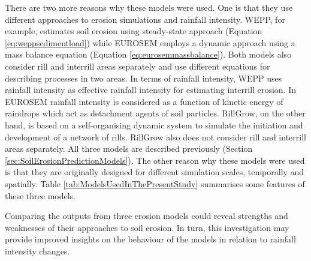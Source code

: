 There are two more reasons why these models were used. One is that they use
different approaches to erosion simulations and rainfall intensity. WEPP, for
example, estimates soil erosion using steady-state approach
(Equation \ref{eq:weppsedimentload}) while EUROSEM employs a dynamic approach
using a mass balance equation (Equation \ref{eq:eurosemmassbalance}).
Both models also consider rill and interrill areas separately and use
different equations for describing processes in two areas. In terms of
rainfall intensity, WEPP uses rainfall intensity as effective rainfall
intensity for estimating interrill erosion. In EUROSEM rainfall intensity is
considered as a function of kinetic energy of raindrops which act as detachment
agents of soil particles.
RillGrow, on the other hand, is based on a
self-organising dynamic system to simulate the initiation and development of a
network of rills. RillGrow also does not consider rill and interrill areas
separately. All three models are described previously (Section
\ref{sec:SoilErosionPredictionModels}).
The other reason why these models were used is that they are
originally designed for different simulation scales, temporally and spatially.
Table \ref{tab:ModelsUsedInThePresentStudy} summarises some features of these
three models.

Comparing the outputs from three erosion models could reveal strengths and
weaknesses of their approaches to soil erosion. In turn, this investigation may
provide improved insights on the behaviour of the models in relation to rainfall
intensity changes.

